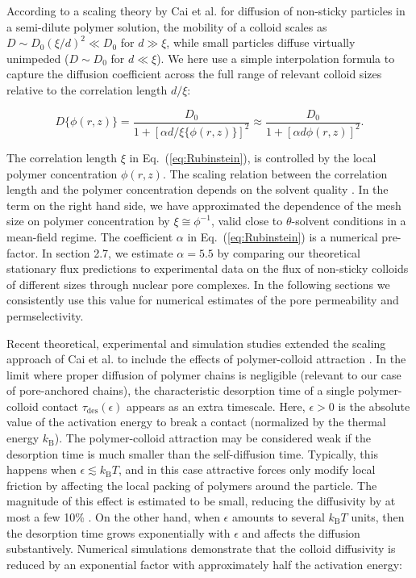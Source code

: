 \documentclass[12pt, a4paper]{article}
\begin{document}
According to a scaling theory by Cai et al. \cite{Cai2011} for diffusion of non-sticky particles in a semi-dilute polymer solution, the mobility of a colloid scales as $D\sim D_0 (\xi/d)^2\ll D_0$ for $d\gg \xi$, while small particles diffuse virtually unimpeded ($D\sim D_0$ for $d\ll \xi$). We here use a simple interpolation formula to capture the diffusion coefficient across the full range of relevant colloid sizes relative to the correlation length $d / \xi$:

\begin{equation}
    D\{\phi(r,z)\} = \frac{D_0}{1+[\alpha d / \xi\{\phi(r,z)\}]^2} \approx \frac{D_0}{1+[\alpha d \phi(r,z)]^2} .
    \label{eq:Rubinstein}
\end{equation}

The correlation length $\xi$ in Eq.~(\ref{eq:Rubinstein}), is controlled by the local polymer concentration $\phi(r,z)$.
The scaling relation between the correlation length and the polymer concentration depends on the solvent quality \cite{DeGennes1979}.
In the term on the right hand side, we have approximated the dependence of the mesh size on polymer concentration by $\xi \cong \phi^{-1}$, valid close to $\theta$-solvent conditions in a mean-field regime.
The coefficient $\alpha$ in Eq.~(\ref{eq:Rubinstein}) is a numerical pre-factor.
In section 2.7, we estimate $\alpha = 5.5$ by comparing our theoretical stationary flux predictions to experimental data on the flux of non-sticky colloids of different sizes through nuclear pore  complexes.
In the following sections we consistently use this value for numerical estimates of the pore permeability and permselectivity.  

Recent theoretical, experimental and simulation studies extended the scaling approach of Cai et al. \cite{Cai2011} to include the effects of polymer-colloid attraction \cite{Yamamoto2018, Carroll2018}.
In the limit where proper diffusion of polymer chains is negligible (relevant to our case of pore-anchored chains), the characteristic desorption time of a single polymer-colloid contact $\tau_\text{des}(\epsilon)$ appears as an extra timescale.
Here, $\epsilon > 0$ is the absolute value of the activation energy to break a contact (normalized by the thermal energy $k_\text{B}$).
The polymer-colloid attraction may be considered weak if the desorption time is much smaller than the self-diffusion time.
Typically, this happens when $\epsilon \lesssim k_\text{B} T$, and in this case attractive forces only modify local friction by affecting the local packing of polymers around the particle.
The magnitude of this effect is estimated to be small, reducing the diffusivity by at most a few 10\% \cite{Yamamoto2011}.
On the other hand, when $\epsilon$ amounts to several $k_\text{B} T$ units, then the desorption time grows exponentially with $\epsilon$ and affects the diffusion substantively.
Numerical simulations \cite{Yamamoto2018} demonstrate that the colloid diffusivity is reduced by an exponential factor with approximately half the activation energy:
\end{document}
